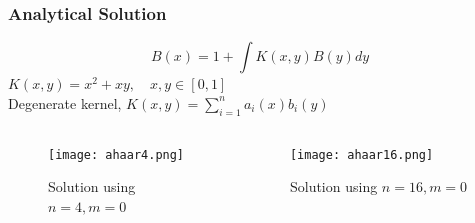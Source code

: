 \begin{frame}\frametitle{Analytical Solution}
\begin{equation}
  B(x)=1+\int K(x,y)B(y)dy
\end{equation}
\centering
$  K(x,y)=x^2+xy, \quad x,y \in [0,1]$\\
\centering
Degenerate kernel, $K(x,y) = \sum\limits_{i=1}^na_i(x)b_i(y) $
 
      \begin{columns}[T]
         \begin{column}{.5\textwidth}

              \begin{figure}
              \centering
              \texttt{[image: ahaar4.png]}
              \caption{Solution using\\ $n=4,m=0$}
              \label{fig_e_vs_n_f1}
              \end{figure}
        \end{column}
         \begin{column}{.5\textwidth}

              \begin{figure}
              \centering
              \texttt{[image: ahaar16.png]}
              \caption{Solution using $n=16,m=0$}
              \label{fig_e_vs_n_f2}
              \end{figure}
        \end{column}
        \end{columns}
\end{frame}



